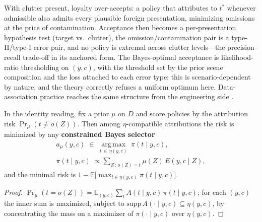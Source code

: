 \begin{thmrem}

With clutter present, loyalty over-accepts: a policy that attributes to \(t^*\) whenever admissible also admits every plausible foreign presentation, minimizing omissions at the price of contamination. Acceptance then becomes a per-presentation hypothesis test (target vs.~clutter), the omission/contamination pair is a type-II/type-I error pair, and no policy is extremal across clutter levels---\hspace{0pt}the precision--recall trade-off in its anchored form. The Bayes-optimal acceptance is likelihood-ratio thresholding on \((y,c)\), with the threshold set by the prior scene composition and the loss attached to each error type; this is scenario-dependent by nature, and the theory correctly refuses a uniform optimum here. Data-association practice reaches the same structure from the engineering side \autocite{barshalom1988}.
\end{thmrem}


\begin{thmplain}

In the identity reading, fix a prior \(\mu\) on \(D\) and score policies by the attribution risk \(\Pr_\mu(t \ne o(Z))\). Then among \(\eta\)-compatible attributions the risk is minimized by any \textbf{constrained Bayes selector}
\[\begin{gathered}a_\mu(y, c) \;\in\; \operatorname*{arg\,max}_{t \,\in\, \eta(y,c)} \; \pi(t \mid y, c), \\ \pi(t \mid y, c) \;\propto \sum_{Z \,:\, o(Z) = t} \mu(Z)\, E(y, c \mid Z),\end{gathered}\]
and the minimal risk is \(1 - \mathbb{E}\big[\max_{t \in \eta(y,c)} \pi(t \mid y, c)\big]\).
\end{thmplain}

\begin{proof}

\(\Pr_\mu(t = o(Z)) = \mathbb{E}_{(y,c)} \sum_t A(t \mid y, c)\, \pi(t \mid y, c)\); for each \((y,c)\) the inner sum is maximized, subject to \(\mathrm{supp}\,A(\cdot \mid y,c) \subseteq \eta(y,c)\), by concentrating the mass on a maximizer of \(\pi(\cdot \mid y, c)\) over \(\eta(y,c)\).
\end{proof}

